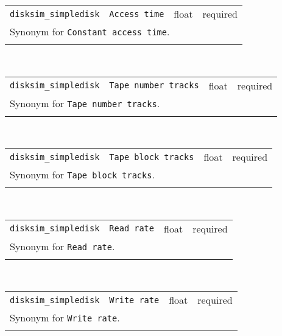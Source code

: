 \noindent 
\begin{tabular}{|p{\lpmodwidth}|p{\lpnamewidth}|p{0.5in}|p{0.5in}|}
\cline{1-4}
\texttt{disksim\_simpledisk} & \texttt{Access time} & float & required \\ 
\cline{1-4}
\multicolumn{4}{|p{6in}|}{
Synonym for \texttt{Constant access time}.
}\\ 
\cline{1-4}
\multicolumn{4}{p{5in}}{}\\
\end{tabular}\\ 
\noindent 
\begin{tabular}{|p{\lpmodwidth}|p{\lpnamewidth}|p{0.5in}|p{0.5in}|}
\cline{1-4}
\texttt{disksim\_simpledisk} & \texttt{Tape number tracks} & float & required \\ 
\cline{1-4}
\multicolumn{4}{|p{6in}|}{
Synonym for \texttt{Tape number tracks}.
}\\ 
\cline{1-4}
\multicolumn{4}{p{5in}}{}\\
\end{tabular}\\ 
\noindent 
\begin{tabular}{|p{\lpmodwidth}|p{\lpnamewidth}|p{0.5in}|p{0.5in}|}
\cline{1-4}
\texttt{disksim\_simpledisk} & \texttt{Tape block tracks} & float & required \\ 
\cline{1-4}
\multicolumn{4}{|p{6in}|}{
Synonym for \texttt{Tape block tracks}.
}\\ 
\cline{1-4}
\multicolumn{4}{p{5in}}{}\\
\end{tabular}\\ 
\noindent 
\begin{tabular}{|p{\lpmodwidth}|p{\lpnamewidth}|p{0.5in}|p{0.5in}|}
\cline{1-4}
\texttt{disksim\_simpledisk} & \texttt{Read rate} & float & required \\ 
\cline{1-4}
\multicolumn{4}{|p{6in}|}{
Synonym for \texttt{Read rate}.
}\\ 
\cline{1-4}
\multicolumn{4}{p{5in}}{}\\
\end{tabular}\\ 
\noindent 
\begin{tabular}{|p{\lpmodwidth}|p{\lpnamewidth}|p{0.5in}|p{0.5in}|}
\cline{1-4}
\texttt{disksim\_simpledisk} & \texttt{Write rate} & float & required \\ 
\cline{1-4}
\multicolumn{4}{|p{6in}|}{
Synonym for \texttt{Write rate}.
}\\ 
\cline{1-4}
\multicolumn{4}{p{5in}}{}\\
\end{tabular}\\ 
